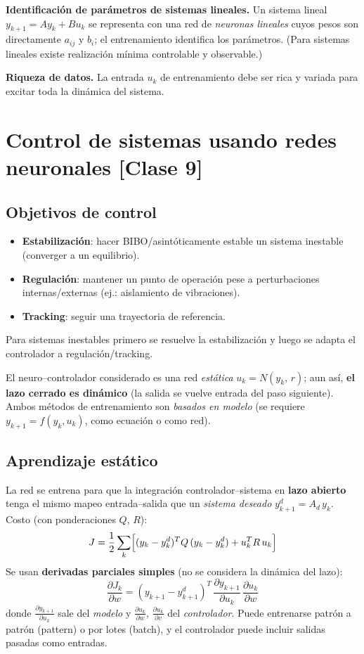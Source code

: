 \documentclass[11pt,a4paper]{article}
\newcommand{\pd}[2]{\frac{\partial #1}{\partial #2}}
\begin{document}
\textbf{Identificación de parámetros de sistemas lineales.} Un sistema lineal $y_{k+1}=Ay_k+Bu_k$ se representa con una red de \emph{neuronas lineales} cuyos pesos son directamente $a_{ij}$ y $b_i$; el entrenamiento identifica los parámetros. (Para sistemas lineales existe realización mínima controlable y observable.)

\textbf{Riqueza de datos.} La entrada $u_k$ de entrenamiento debe ser rica y variada para excitar toda la dinámica del sistema.

\section{Control de sistemas usando redes neuronales \hfill {\normalsize [Clase 9]}}

\subsection{Objetivos de control}

\begin{itemize}[itemsep=1pt]
\item \textbf{Estabilización}: hacer BIBO/asintóticamente estable un sistema inestable (converger a un equilibrio).
\item \textbf{Regulación}: mantener un punto de operación pese a perturbaciones internas/externas (ej.: aislamiento de vibraciones).
\item \textbf{Tracking}: seguir una trayectoria de referencia.
\end{itemize}
Para sistemas inestables primero se resuelve la estabilización y luego se adapta el controlador a regulación/tracking.

El neuro--controlador considerado es una red \emph{estática} $u_k=N(y_k,\,r)$; aun así, \textbf{el lazo cerrado es dinámico} (la salida se vuelve entrada del paso siguiente). Ambos métodos de entrenamiento son \emph{basados en modelo} (se requiere $y_{k+1}=f(y_k,u_k)$, como ecuación o como red).

\subsection{Aprendizaje estático}

La red se entrena para que la integración controlador--sistema en \textbf{lazo abierto} tenga el mismo mapeo entrada--salida que un \emph{sistema deseado} $y_{k+1}^d=A_d\,y_k$. Costo (con ponderaciones $Q$, $R$):
\[
J=\frac12\sum_k\Bigl[(y_k-y_k^{d})^{T}Q\,(y_k-y_k^{d})+u_k^{T}R\,u_k\Bigr]
\]
Se usan \textbf{derivadas parciales simples} (no se considera la dinámica del lazo):
\[
\pd{J_k}{w}=(y_{k+1}-y_{k+1}^{d})^{T}\,\pd{y_{k+1}}{u_k}\,\pd{u_k}{w}
\]
donde $\pd{y_{k+1}}{u_k}$ sale del \emph{modelo} y $\pd{u_k}{w}$, $\pd{u_k}{v}$ del \emph{controlador}. Puede entrenarse patrón a patrón (pattern) o por lotes (batch), y el controlador puede incluir salidas pasadas como entradas.
\end{document}
